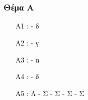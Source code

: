 \documentclass[12pt]{article}
\begin{document}
  \part*{}

  \section*{Θέμα Α}
  \begin{enumerate}
    \item [A1]: - δ
    \item [A2]: - γ
    \item [A3]: - α
    \item [A4]: - δ
    \item [A5]:  Λ - Σ - Σ - Σ - Σ
  \end{enumerate}
\end{document}
